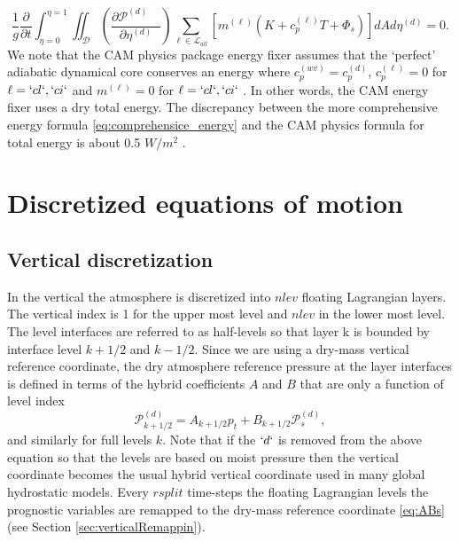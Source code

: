 \documentclass{agujournal}
\begin{document}
{\begin{equation}
\frac{1}{g}\frac{\partial }{\partial t}\int_{\eta=0}^{\eta=1} \iint_\mathcal{D} \left( \frac{\partial \mathcal{P}^{(d)}\quad }{\partial \eta^{(d)}} \right)\sum_{\ell \in \mathcal{L}_{all}} \left[m^{(\ell)} \left(K+c_p^{(\ell)}T+\Phi_s  \right)\right]  dA d \eta^{(d)}=0.\label{eq:comprehensice_energy}
\end{equation}
We note that the CAM physics package energy fixer assumes that the `perfect' adiabatic dynamical core conserves an energy where $c_p^{(wv)}= c_p^{(d)}$, $c_p^{(\ell)}=0$ for $\ell=`cl`,`ci`$ and $m^{(\ell)}=0$ for $\ell=`cl`,`ci`$ \citep{WOHTTV2015JAMES}. In other words, the CAM energy fixer uses a dry total energy. The discrepancy between the more comprehensive energy formula \eqref{eq:comprehensice_energy} and the CAM physics formula for total energy is about 0.5 $W/m^2$ \citep{T2011LNCSEb}.

%



\section{Discretized equations of motion}\label{sec:discretized_eqs}
\subsection{Vertical discretization}
In the vertical the atmosphere is discretized into $nlev$ floating Lagrangian layers. The vertical index is 1 for the upper most level and $nlev$ in the lower most level. The level interfaces are referred to as half-levels so that layer k is bounded by interface level $k+1/2$ and $k-1/2$. Since we are using a dry-mass vertical reference coordinate, the dry atmosphere reference pressure at the layer interfaces is defined in terms of the hybrid coefficients $A$ and $B$
 that are only a function of level index
\begin{equation}
\mathcal{P}^{(d)}_{k+1/2}=A_{k+1/2}p_t+B_{k+1/2}\mathcal{P}_s^{(d)},\label{eq:ABs}
\end{equation}
and similarly for full levels $k$. Note that if the $`d`$ is removed from the above equation so that the levels are based on moist pressure then the vertical coordinate becomes the usual hybrid vertical coordinate used in many global hydrostatic models. Every $rsplit$ time-steps the floating Lagrangian levels the prognostic variables are remapped to the dry-mass reference coordinate \eqref{eq:ABs} (see Section \ref{sec:verticalRemappin}). 

}
\end{document}
